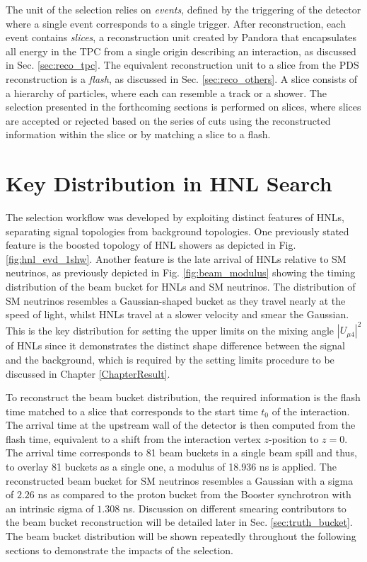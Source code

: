 The unit of the selection relies on \textit{events}, defined by the triggering of the detector where a single event corresponds to a single trigger.
After reconstruction, each event contains \textit{slices}, a reconstruction unit created by Pandora that encapsulates all energy in the TPC from a single origin describing an interaction, as discussed in Sec. \ref{sec:reco_tpc}.        
The equivalent reconstruction unit to a slice from the PDS reconstruction is a \textit{flash}, as discussed in Sec. \ref{sec:reco_others}.
A slice consists of a hierarchy of particles, where each can resemble a track or a shower.
The selection presented in the forthcoming sections is performed on slices, where slices are accepted or rejected based on the series of cuts using the reconstructed information within the slice or by matching a slice to a flash.


\section{Key Distribution in HNL Search}
\label{sec:key_dist}

The selection workflow was developed by exploiting distinct features of HNLs, separating signal topologies from background topologies.
One previously stated feature is the boosted topology of HNL showers as depicted in Fig. \ref{fig:hnl_evd_1shw}.
Another feature is the late arrival of HNLs relative to SM neutrinos, as previously depicted in Fig. \ref{fig:beam_modulus} showing the timing distribution of the beam bucket for HNLs and SM neutrinos.
The distribution of SM neutrinos resembles a Gaussian-shaped bucket as they travel nearly at the speed of light, whilst HNLs travel at a slower velocity and smear the Gaussian.
This is the key distribution for setting the upper limits on the mixing angle $|U_{\mu4}|^2$ of HNLs since it demonstrates the distinct shape difference between the signal and the background, which is required by the setting limits procedure to be discussed in Chapter \ref{ChapterResult}.

To reconstruct the beam bucket distribution, the required information is the flash time matched to a slice that corresponds to the start time $t_0$ of the interaction.
The arrival time at the upstream wall of the detector is then computed from the flash time, equivalent to a shift from the interaction vertex $z$-position to $z = 0$.
The arrival time corresponds to 81 beam buckets in a single beam spill and thus, to overlay 81 buckets as a single one, a modulus of 18.936 ns is applied.
The reconstructed beam bucket for SM neutrinos resembles a Gaussian with a sigma of $2.26$ ns as compared to the proton bucket from the Booster synchrotron with an intrinsic sigma of $1.308$ ns.
Discussion on different smearing contributors to the beam bucket reconstruction will be detailed later in Sec. \ref{sec:truth_bucket}.
The beam bucket distribution will be shown repeatedly throughout the following sections to demonstrate the impacts of the selection.

